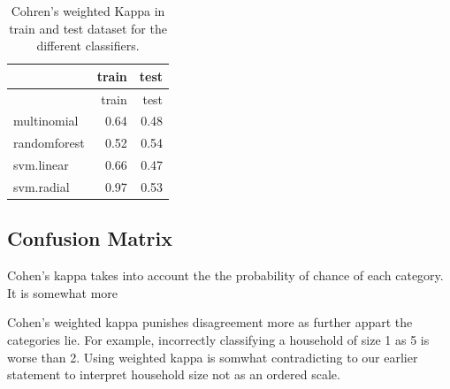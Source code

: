 \documentclass[]{article}
\newenvironment{Shaded}{\begin{snugshade}}{\end{snugshade}}
\newcommand{\ControlFlowTok}[1]{\textcolor[rgb]{0.13,0.29,0.53}{\textbf{#1}}}
\newcommand{\DataTypeTok}[1]{\textcolor[rgb]{0.13,0.29,0.53}{#1}}
\newcommand{\KeywordTok}[1]{\textcolor[rgb]{0.13,0.29,0.53}{\textbf{#1}}}
\newcommand{\NormalTok}[1]{#1}
\newcommand{\OperatorTok}[1]{\textcolor[rgb]{0.81,0.36,0.00}{\textbf{#1}}}
\newcommand{\StringTok}[1]{\textcolor[rgb]{0.31,0.60,0.02}{#1}}
\begin{document}
\begin{Shaded}
\end{Shaded}

\begin{longtable}[]{@{}lrr@{}}
\caption{\label{tab:tab8} Cohren's weighted Kappa in train and test
dataset for the different classifiers.}\tabularnewline
\toprule
& train & test\tabularnewline
\midrule
\endfirsthead
\toprule
& train & test\tabularnewline
\midrule
\endhead
multinomial & 0.64 & 0.48\tabularnewline
randomforest & 0.52 & 0.54\tabularnewline
svm.linear & 0.66 & 0.47\tabularnewline
svm.radial & 0.97 & 0.53\tabularnewline
\bottomrule
\end{longtable}

\hypertarget{confusion-matrix}{%
\subsection{Confusion Matrix}\label{confusion-matrix}}

Cohen's kappa takes into account the the probability of chance of each
category. It is somewhat more

Cohen's weighted kappa punishes disagreement more as further appart the
categories lie. For example, incorrectly classifying a household of size
1 as 5 is worse than 2. Using weighted kappa is somwhat contradicting to
our earlier statement to interpret household size not as an ordered
scale.
\end{document}
